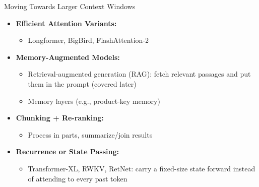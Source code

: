 \begin{frame}{Moving Towards Larger Context Windows}
  \begin{itemize}
    \item[\textcolor{red}{$\blacktriangleright$}] \textbf{Efficient Attention Variants:}
      \begin{itemize}
        \item Longformer, BigBird, FlashAttention-2
      \end{itemize}
    \item[\textcolor{red}{$\blacktriangleright$}] \textbf{Memory-Augmented Models:}
      \begin{itemize}
        \item Retrieval-augmented generation (RAG): fetch relevant passages and put them in the prompt (covered later)
        \item Memory layers (e.g., product-key memory)
      \end{itemize}
    \item[\textcolor{red}{$\blacktriangleright$}] \textbf{Chunking + Re-ranking:}
      \begin{itemize}
        \item Process in parts, summarize/join results
      \end{itemize}
    \item[\textcolor{red}{$\blacktriangleright$}] \textbf{Recurrence or State Passing:}
      \begin{itemize}
        \item Transformer-XL, RWKV, RetNet: carry a fixed-size state forward instead of attending to every past token
      \end{itemize}
  \end{itemize}
\end{frame}


